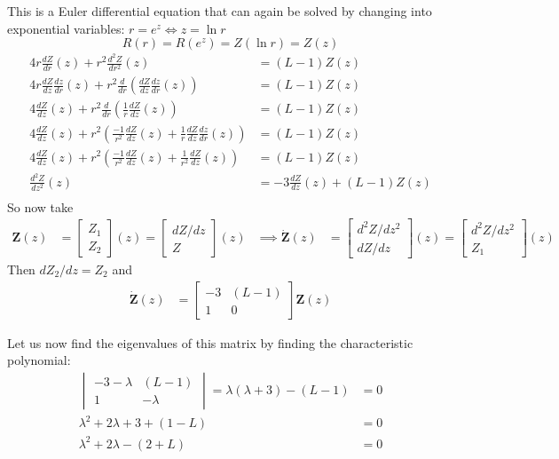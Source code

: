 \documentclass{article}	%
\theoremstyle{definition}
\begin{document}
This is a Euler differential equation that can again be solved by changing into exponential variables: $r=e^{z} \iff z=\ln r$
\[ R(r) = R(e^{z}) = Z(\ln r) = Z(z)\]
\begin{align*}
4r\frac{dZ}{dr}(z) +r^{2}\frac{d^{2}Z}{dr^{2}}(z) &= (L-1)Z(z)\\
4r\frac{dZ}{dz}\frac{dz}{dr}(z) +r^{2}\frac{d}{dr}\left( \frac{dZ}{dz}\frac{dz}{dr}(z) \right) &= (L-1)Z(z)\\
4\frac{dZ}{dz}(z) +r^{2}\frac{d}{dr}\left( \frac{1}{r}\frac{dZ}{dz}(z) \right) &= (L-1)Z(z)\\
4\frac{dZ}{dz}(z) +r^{2}\left( \frac{-1}{r^{2}}\frac{dZ}{dz}(z) +\frac{1}{r}\frac{dZ}{dz}\frac{dz}{dr}(z) \right) &= (L-1)Z(z)\\
4\frac{dZ}{dz}(z) +r^{2}\left( \frac{-1}{r^{2}}\frac{dZ}{dz}(z) +\frac{1}{r^{2}}\frac{dZ}{dz}(z) \right) &= (L-1)Z(z)\\
\frac{d^{2}Z}{dz^{2}}(z) &= -3\frac{dZ}{dz}(z) +(L-1)Z(z)\\
\end{align*}
So now take
\begin{align*}
\mathbf{Z}(z) &= 
\begin{bmatrix}
Z_{1}\\
Z_{2}
\end{bmatrix}
(z)
=
\begin{bmatrix}
dZ/dz\\
Z
\end{bmatrix}
(z)
&\implies
\dot{\mathbf{Z}}(z) &=
\begin{bmatrix}
d^{2}Z/dz^{2}\\
dZ/dz
\end{bmatrix}
(z)
=
\begin{bmatrix}
d^{2}Z/dz^{2}\\
Z_{1}
\end{bmatrix}
(z)
\end{align*}
Then $dZ_{2}/dz = Z_{2}$ and
\begin{align*}
\dot{\mathbf{Z}}(z) &=
\begin{bmatrix}
-3	&	(L-1)	\\
1	&	0
\end{bmatrix}
\mathbf{Z}(z)
\end{align*}

Let us now find the eigenvalues of this matrix by finding the characteristic polynomial:
\begin{align*}
\begin{vmatrix}
-3-\lambda	&	(L-1)	\\
1			&	-\lambda
\end{vmatrix}
= \lambda(\lambda+3)-(L-1) &= 0\\
\lambda^{2} +2\lambda +3 +(1-L) &= 0\\
\lambda^{2} +2\lambda -(2+L) &= 0
\end{align*}
\end{document}
